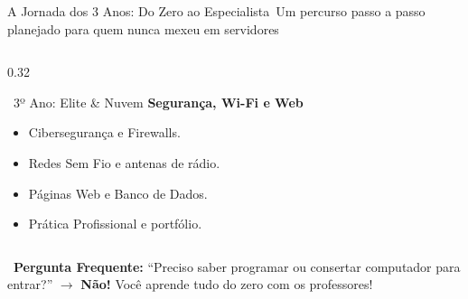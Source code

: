 \begin{frame}{A Jornada dos 3 Anos: Do Zero ao Especialista}{\faRoute\ Um percurso passo a passo planejado para quem nunca mexeu em servidores}
\begin{columns}[t]
    \begin{column}{0.32\textwidth}
      \begin{purplecard}{\faLock\ 3º Ano: Elite \& Nuvem}
        \tiny
        \textbf{Segurança, Wi-Fi e Web}
        \begin{itemize}\setlength{\itemsep}{0.12em}
          \item Cibersegurança e Firewalls.
          \item Redes Sem Fio e antenas de rádio.
          \item Páginas Web e Banco de Dados.
          \item Prática Profissional e portfólio.
        \end{itemize}
        \vspace{0.06cm}
        \centering{}
      \end{purplecard}
    \end{column}
  \end{columns}
  
  \vspace{0.08cm}
  \begin{statcard}
    \tiny \textcolor{IFCEDarkGreen}{\faLightbulb\ \textbf{Pergunta Frequente:} ``Preciso saber programar ou consertar computador para entrar?'' $\rightarrow$ \textbf{Não!} Você aprende tudo do zero com os professores!}
  \end{statcard}
\end{frame}

